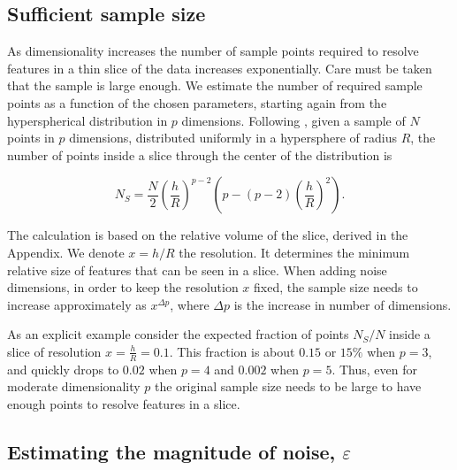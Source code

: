 \documentclass[]{interact}
\theoremstyle{plain}%
\theoremstyle{definition}
\theoremstyle{remark}
\begin{document}
\hypertarget{sufficient-sample-size}{%
\subsection{\texorpdfstring{Sufficient sample size
\label{sec:size}}{Sufficient sample size }}\label{sufficient-sample-size}}

As dimensionality increases the number of sample points required to
resolve features in a thin slice of the data increases exponentially.
Care must be taken that the sample is large enough. We estimate the
number of required sample points as a function of the chosen parameters,
starting again from the hyperspherical distribution in \(p\) dimensions.
Following \citet{laa2019slice}, given a sample of \(N\) points in \(p\)
dimensions, distributed uniformly in a hypersphere of radius \(R\), the
number of points inside a slice through the center of the distribution
is

\begin{equation}
N_S = \frac{N}{2} \left(\frac{h}{R}\right)^{p-2} \left(p - (p-2)\left(\frac{h}{R}\right)^{2}\right).
\label{eq:count}
\end{equation}

\noindent The calculation is based on the relative volume of the slice,
derived in the Appendix. We denote \(x=h/R\) the resolution. It
determines the minimum relative size of features that can be seen in a
slice. When adding noise dimensions, in order to keep the resolution
\(x\) fixed, the sample size needs to increase approximately as
\(x^{\Delta p}\), where \(\Delta p\) is the increase in number of
dimensions.

As an explicit example consider the expected fraction of points
\(N_S/N\) inside a slice of resolution \(x=\frac{h}{R}=0.1\). This
fraction is about \(0.15\) or \(15\%\) when \(p=3\), and quickly drops
to \(0.02\) when \(p=4\) and \(0.002\) when \(p=5\). Thus, even for
moderate dimensionality \(p\) the original sample size needs to be large
to have enough points to resolve features in a slice.

\hypertarget{estimating-the-magnitude-of-noise-varepsilon}{%
\subsection{\texorpdfstring{Estimating the magnitude of noise,
\(\varepsilon\)
\label{sec:epsilon}}{Estimating the magnitude of noise, \textbackslash varepsilon }}\label{estimating-the-magnitude-of-noise-varepsilon}}
\end{document}
